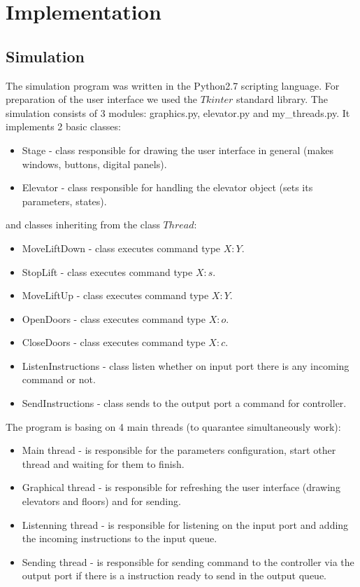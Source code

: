 \documentclass[12pt]{article}
\begin{document}


\section{Implementation}
\subsection{Simulation}
The simulation program was written in the Python2.7 scripting language. For preparation of the user interface we used the $Tkinter$ standard library. 
The simulation consists of 3 modules: graphics.py, elevator.py and my{\_}threads.py. It implements 2 basic classes:  
\begin{itemize}
 \item Stage - class responsible for drawing the user interface in general (makes windows, buttons, digital panels).
 \item Elevator - class responsible for handling the elevator object (sets its parameters, states). 
\end{itemize}
and classes inheriting from the class $Thread$:
\begin{itemize}
 \item MoveLiftDown - class executes command type $X:Y$.
 \item StopLift - class executes command type $X:s$.
 \item MoveLiftUp - class executes command type $X:Y$.
 \item OpenDoors - class executes command type $X:o$.
 \item CloseDoors - class executes command type $X:c$.
 \item ListenInstructions - class listen whether on input port there is any incoming command or not.
 \item SendInstructions - class sends to the output port a command for controller.
\end{itemize}


The program is basing on 4 main threads (to quarantee simultaneously work): 
\begin{itemize}
	\item Main thread - is responsible for the parameters configuration, start other thread and waiting for them to finish.
	\item Graphical thread - is responsible for refreshing the user interface (drawing elevators and floors) and for sending. 
	\item Listenning thread - is responsible for listening on the input port and adding the incoming instructions to the input queue.
	\item Sending thread - is responsible for sending command to the controller via the output port if there is a instruction ready to send in the output queue.		
\end{itemize}
\end{document}
